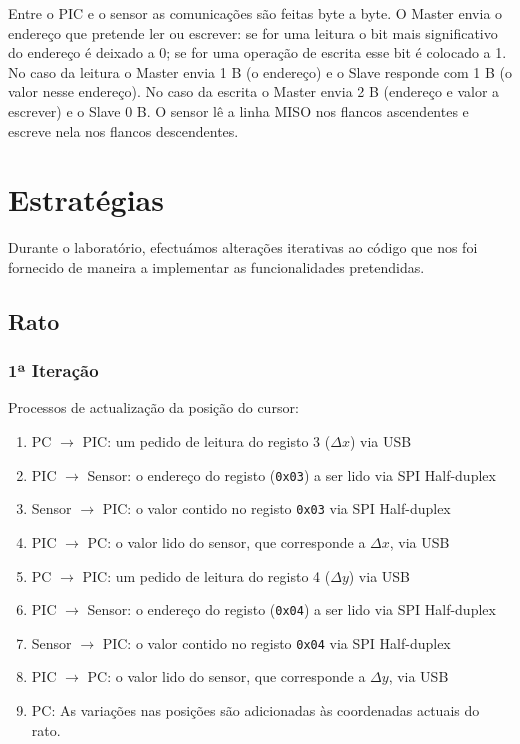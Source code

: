\documentclass[a4paper]{article}
\begin{document}
Entre o PIC e o sensor as comunicações são feitas byte a byte. O Master envia o endereço que pretende ler ou escrever: se for uma leitura o bit mais significativo do endereço é deixado a 0; se for uma operação de escrita esse bit é colocado a 1. No caso da leitura o Master envia 1 B (o endereço) e o Slave responde com 1 B (o valor nesse endereço). No caso da escrita o Master envia 2 B (endereço e valor a escrever) e o Slave 0 B. O sensor lê a linha MISO nos flancos ascendentes e escreve nela nos flancos descendentes.


\section{Estratégias}
Durante o laboratório, efectuámos alterações iterativas ao código que nos foi fornecido de maneira a implementar as funcionalidades pretendidas.

\subsection{Rato}

\subsubsection{1ª Iteração}
Processos de actualização da posição do cursor:
\begin{enumerate}
    \item PC $\rightarrow$ PIC: um pedido de leitura do registo 3 ($\Delta x$) via USB
    \item PIC $\rightarrow$ Sensor: o endereço do registo (\texttt{0x03}) a ser lido via SPI Half-duplex
    \item Sensor $\rightarrow$ PIC: o valor contido no registo \texttt{0x03} via SPI Half-duplex
    \item PIC $\rightarrow$ PC: o valor lido do sensor, que corresponde a $\Delta x$, via USB
    \item PC $\rightarrow$ PIC: um pedido de leitura do registo 4 ($\Delta y$) via USB
    \item PIC $\rightarrow$ Sensor: o endereço do registo (\texttt{0x04}) a ser lido via SPI Half-duplex
    \item Sensor $\rightarrow$ PIC: o valor contido no registo \texttt{0x04} via SPI Half-duplex
    \item PIC $\rightarrow$ PC: o valor lido do sensor, que corresponde a $\Delta y$, via USB
    \item PC: As variações nas posições são adicionadas às coordenadas actuais do rato.
\end{enumerate}
\end{document}

